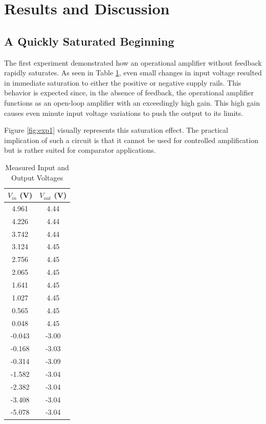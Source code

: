 \documentclass[12pt]{article}
\begin{document}
\section{Results and Discussion}
\subsection{A Quickly Saturated Beginning}

The first experiment demonstrated how an operational amplifier without feedback rapidly saturates. As seen in Table \ref{tab:measured_data}, even small changes in input voltage resulted in immediate saturation to either the positive or negative supply rails. This behavior is expected since, in the absence of feedback, the operational amplifier functions as an open-loop amplifier with an exceedingly high gain. This high gain causes even minute input voltage variations to push the output to its limits.

Figure \ref{fig:exp1} visually represents this saturation effect. The practical implication of such a circuit is that it cannot be used for controlled amplification but is rather suited for comparator applications.
\begin{table}[H]
	\centering
	\begin{tabular}{|c|c|}
		\hline
		$V_{in}$ (V) & $V_{out}$ (V) \\
		\hline
		4.961        & 4.44          \\
		4.226        & 4.44          \\
		3.742        & 4.44          \\
		3.124        & 4.45          \\
		2.756        & 4.45          \\
		2.065        & 4.45          \\
		1.641        & 4.45          \\
		1.027        & 4.45          \\
		0.565        & 4.45          \\
		0.048        & 4.45          \\
		-0.043       & -3.00         \\
		-0.168       & -3.03         \\
		-0.314       & -3.09         \\
		-1.582       & -3.04         \\
		-2.382       & -3.04         \\
		-3.408       & -3.04         \\
		-5.078       & -3.04         \\
		\hline
	\end{tabular}
	\caption{Measured Input and Output Voltages}
	\label{tab:measured_data}
\end{table}
\end{document}
